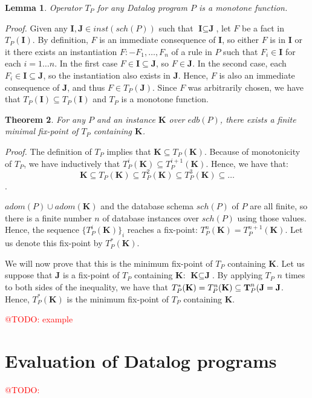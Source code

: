 \documentclass{pracamgr}
\makeatletter
\theoremstyle{plain}
\newtheorem{thm}{Theorem}[section]
\newtheorem{lem}[thm]{Lemma}
\theoremstyle{definition}
\theoremstyle{remark}
\newcommand{\todo}[1]{\textcolor{red}{@TODO: #1}}
\makeatother
\begin{document}
\begin{lem}
Operator $T_P$ for any Datalog program $P$ is a monotone function.
\end{lem}
\emph{Proof.} Given any $\textbf{I}, \textbf{J} \in inst(sch(P))$ such that $\textbf{I} \subseteq \textbf{J}$, let $F$ be a fact in $T_P(\textbf{I})$.
By definition, $F$ is an immediate consequence of $\textbf{I}$, so either $F$ is in $\textbf{I}$ or it there exists an instantiation
 $F :- F_1, \dots, F_n$ of a rule in $P$ such that $F_i \in \textbf{I}$ for each $i = 1\dots n$. 
In the first case $F \in \textbf{I} \subseteq \textbf{J}$, so $F \in \textbf{J}$. 
In the second case, each $F_i \in \textbf{I} \subseteq \textbf{J}$, so the instantiation also exists in $\textbf{J}$. 
Hence, $F$ is also an immediate consequence of $\textbf{J}$, and thus $F \in T_P(\textbf{J})$. 
Since $F$ was arbitrarily chosen, we have that $T_P(\textbf{I}) \subseteq T_P(\textbf{I})$ and $T_P$ is a monotone function.

\begin{thm}
For any $P$ and an instance $\textbf{K}$ over $edb(P)$, there exists a finite minimal fix-point of $T_P$ containing $\textbf{K}$.
\end{thm}\label{t:datalogfixpointsem}
\emph{Proof.}
The definition of $T_P$ implies that $\textbf{K} \subseteq T_P(\textbf{K})$.
Because of monotonicity of $T_P$, we have inductively that $T_P^i(\textbf{K}) \subseteq T_P^{i+1}(\textbf{K})$.
Hence, we have that:
$$\textbf{K} \subseteq T_P(\textbf{K}) \subseteq T_P^2(\textbf{K}) \subseteq T_P^3(\textbf{K}) \subseteq \dots$$.

$adom(P) \cup adom(\textbf{K})$ and the database schema $sch(P)$ of $P$ are all finite, so there is a finite number $n$ of database instances over $sch(P)$ using those values. Hence, the sequence $\{T_P^i(\textbf{K})\}_i$ reaches a fix-point: $T_P^n(\textbf{K}) = T_P^{n+1}(\textbf{K})$. Let us denote this fix-point by $T_P^*(\textbf{K})$.

We will now prove that this is the minimum fix-point of $T_P$ containing $\textbf{K}$. Let us suppose that $\textbf{J}$ is a fix-point of $T_P$ containing  $\textbf{K}$:  $\textbf{K} \subseteq \textbf{J}$. By applying $T_P$ $n$ times to both sides of the inequality, we have that $T_P^*(\textbf{K}) = T_P^n(\textbf{K}) \subseteq \textbf T_P^n(\textbf{J} = \textbf{J}$. Hence, $T_P^*(\textbf{K})$ is the minimum fix-point of $T_P$ containing $\textbf{K}$.


\todo{example}

\section{Evaluation of Datalog programs}
\todo{}
\end{document}
